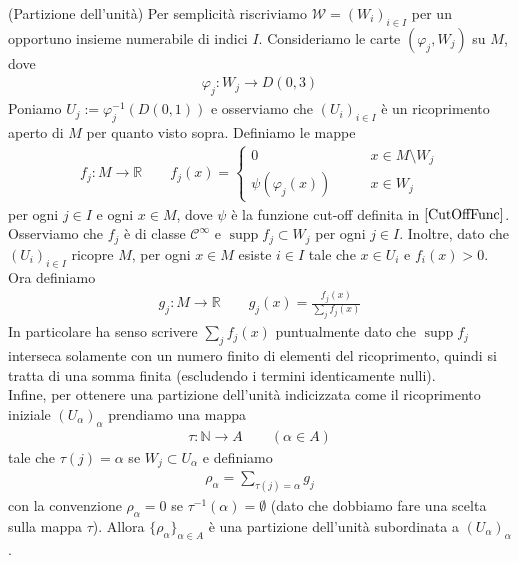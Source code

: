 \documentclass[oneside, 11pt]{amsbook}
\makeatletter
\newcommand{\C}{\mathcal{C}}
\newcommand{\W}{\mathcal{W}}
\newcommand{\R}{\mathbb{R}}
\newcommand{\vp}{\varphi}
\newcommand{\N}{{\mathbb N}}
\newcommand{\0}{{(0)}}
\newcommand{\3}{{(3)}}
\theoremstyle{colonplain}
\theoremstyle{colondefinition}
\theoremstyle{colonremark}
\numberwithin{equation}{chapter}
\renewcommand{\proofname}{Dimostrazione}
\renewenvironment{proof}[1][\proofname]{\par
  \pushQED{\qed}%
  \normalfont \topsep6\p@\@plus6\p@\relax
  \trivlist
  \item[\hskip\labelsep\bfseries #1:]\ignorespaces
}{%
  \popQED\endtrivlist\@endpefalse
}
\makeatother
\begin{document}
\begin{proof}
    (Partizione dell'unità) Per semplicità riscriviamo $\W = (W_i)_{i \in I}$ per un opportuno insieme numerabile di indici $I$. Consideriamo le carte $(\vp_j, W_j)$ su $M$, dove
    \begin{align}
        \vp_j : W_j \longrightarrow D(0, 3)
    \end{align}
    Poniamo $U_j := \vp^{-1}_j(D(0, 1))$ e osserviamo che $(U_i)_{i \in I}$ è un ricoprimento aperto di $M$ per quanto visto sopra. Definiamo le mappe
    \begin{align}
        f_j : M \longrightarrow \R \qquad f_j(x) = \begin{cases}
            0 &\qquad x \in M \setminus W_j \\
            \psi(\vp_j(x)) &\qquad x \in W_j
        \end{cases}
    \end{align}
    per ogni $j \in I$ e ogni $x \in M$, dove $\psi$ è la funzione cut-off definita in $\eqref{CutOffFunc}$. Osserviamo che $f_j$ è di classe $\C^\infty$ e $\operatorname{supp} f_j \subset W_j$ per ogni $j \in I$. Inoltre, dato che $(U_i)_{i \in I}$ ricopre $M$, per ogni $x \in M$ esiste $i \in I$ tale che $x \in U_i$ e $f_i(x) > 0$. \\
    Ora definiamo
    \begin{align}
        g_j : M \longrightarrow \R \qquad g_j(x) = \frac{f_j(x)}{\sum_j f_j(x)}
    \end{align}
    In particolare ha senso scrivere $\sum_j f_j(x)$ puntualmente dato che $\operatorname{supp} f_j$ interseca solamente con un numero finito di elementi del ricoprimento, quindi si tratta di una somma finita (escludendo i termini identicamente nulli). \\
    Infine, per ottenere una partizione dell'unità indicizzata come il ricoprimento iniziale $(U_\alpha)_\alpha$ prendiamo una mappa
    \begin{align}
        \tau : \N \longrightarrow A \qquad (\alpha \in A)
    \end{align}
    tale che $\tau(j) = \alpha$ se $W_j \subset U_\alpha$ e definiamo
    \begin{align}
        \rho_\alpha = \sum_{\tau(j) = \alpha} g_j
    \end{align}
    con la convenzione $\rho_\alpha = 0$ se $\tau^{-1}(\alpha) = \emptyset$ (dato che dobbiamo fare una scelta sulla mappa $\tau$). Allora $\{\rho_\alpha\}_{\alpha \in A}$ è una partizione dell'unità subordinata a $(U_\alpha)_\alpha$.
\end{proof}
\end{document}
